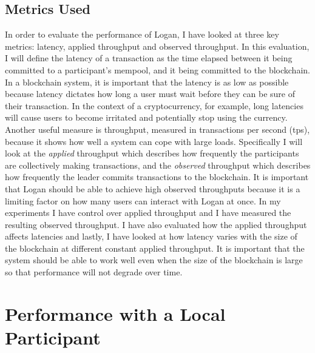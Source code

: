 \documentclass[12pt,a4paper,twoside,openright]{report}
\begin{document}
	\subsection*{Metrics Used}
	In order to evaluate the performance of Logan, I have looked at three key metrics: latency, applied throughput and observed throughput.
	In this evaluation, I will define the latency of a transaction as the time elapsed between it being committed to a participant's mempool, and it being committed to the blockchain.
	In a blockchain system, it is important that the latency is as low as possible because latency dictates how long a user must wait before they can be sure of their transaction.
	In the context of a cryptocurrency, for example, long latencies will cause users to become irritated and potentially stop using the currency.
	Another useful measure is throughput, measured in transactions per second (tps), because it shows how well a system can cope with large loads.
	Specifically I will look at the \textit{applied} throughput which describes how frequently the participants are collectively making transactions, and the \textit{observed} throughput which describes how frequently the leader commits transactions to the blockchain.
	It is important that Logan should be able to achieve high observed throughputs because it is a limiting factor on how many users can interact with Logan at once.
	In my experiments I have control over applied throughput and I have measured the resulting observed throughput.
	I have also evaluated how the applied throughput affects latencies and lastly, I have looked at how latency varies with the size of the blockchain at different constant applied throughput.
	It is important that the system should be able to work well even when the size of the blockchain is large so that performance will not degrade over time.
	
	\section{Performance with a Local Participant}
\end{document}
